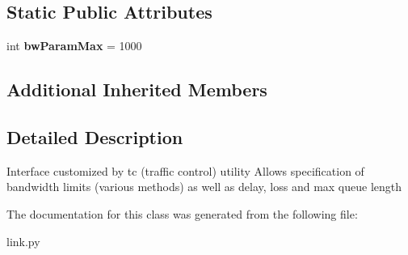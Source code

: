 \subsection*{Static Public Attributes}
\begin{DoxyCompactItemize}
\item 
\hypertarget{classmininet_1_1link_1_1TCIntf_aefe3cc2d66662f5aeef18a55f1796146}{int {\bfseries bw\-Param\-Max} = 1000}\label{classmininet_1_1link_1_1TCIntf_aefe3cc2d66662f5aeef18a55f1796146}

\end{DoxyCompactItemize}
\subsection*{Additional Inherited Members}


\subsection{Detailed Description}
\begin{DoxyVerb}Interface customized by tc (traffic control) utility
   Allows specification of bandwidth limits (various methods)
   as well as delay, loss and max queue length\end{DoxyVerb}
 

The documentation for this class was generated from the following file\-:\begin{DoxyCompactItemize}
\item 
link.\-py\end{DoxyCompactItemize}
